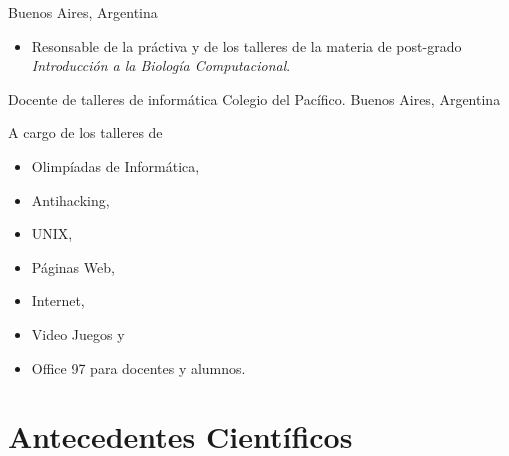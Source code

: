 	{Buenos Aires, Argentina}
	{}
	{\begin{itemize}
	\item Resonsable de la práctiva y de los talleres de la materia de post-grado \emph{Introducción a la Biología Computacional}.
	\end{itemize}}
	{Docente de talleres de informática}
	{Colegio del Pacífico.}
	{Buenos Aires, Argentina}
	{}
	{A cargo de los talleres de \begin{itemize}
	\item Olimpíadas de Informática,
	\item Antihacking,
	\item UNIX,
	\item Páginas Web,
	\item Internet,
	\item Video Juegos y
	\item Office 97 para docentes y alumnos.
	\end{itemize}}

\section{Antecedentes Científicos}\label{cientificos:desde}

